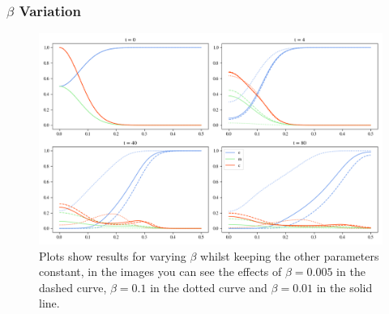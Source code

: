 \subsubsection*{$\beta$ Variation}
\begin{figure}[h]
    \centering
    \includegraphics[width=\textwidth]{resources/images/beta_variation.png}
    \caption{Plots show results for varying $\beta$ whilst keeping the other parameters constant, in the images you can see the effects of $\beta=0.005$ in the dashed curve, $\beta=0.1$ in the dotted curve and $\beta=0.01$ in the solid line.}
    \label{fig:beta_variation}
\end{figure}

